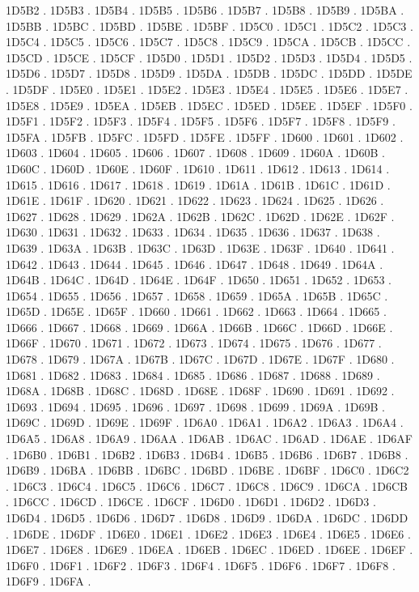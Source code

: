 1D5B2 .
1D5B3 .
1D5B4 .
1D5B5 .
1D5B6 .
1D5B7 .
1D5B8 .
1D5B9 .
1D5BA .
1D5BB .
1D5BC .
1D5BD .
1D5BE .
1D5BF .
1D5C0 .
1D5C1 .
1D5C2 .
1D5C3 .
1D5C4 .
1D5C5 .
1D5C6 .
1D5C7 .
1D5C8 .
1D5C9 .
1D5CA .
1D5CB .
1D5CC .
1D5CD .
1D5CE .
1D5CF .
1D5D0 .
1D5D1 .
1D5D2 .
1D5D3 .
1D5D4 .
1D5D5 .
1D5D6 .
1D5D7 .
1D5D8 .
1D5D9 .
1D5DA .
1D5DB .
1D5DC .
1D5DD .
1D5DE .
1D5DF .
1D5E0 .
1D5E1 .
1D5E2 .
1D5E3 .
1D5E4 .
1D5E5 .
1D5E6 .
1D5E7 .
1D5E8 .
1D5E9 .
1D5EA .
1D5EB .
1D5EC .
1D5ED .
1D5EE .
1D5EF .
1D5F0 .
1D5F1 .
1D5F2 .
1D5F3 .
1D5F4 .
1D5F5 .
1D5F6 .
1D5F7 .
1D5F8 .
1D5F9 .
1D5FA .
1D5FB .
1D5FC .
1D5FD .
1D5FE .
1D5FF .
1D600 .
1D601 .
1D602 .
1D603 .
1D604 .
1D605 .
1D606 .
1D607 .
1D608 .
1D609 .
1D60A .
1D60B .
1D60C .
1D60D .
1D60E .
1D60F .
1D610 .
1D611 .
1D612 .
1D613 .
1D614 .
1D615 .
1D616 .
1D617 .
1D618 .
1D619 .
1D61A .
1D61B .
1D61C .
1D61D .
1D61E .
1D61F .
1D620 .
1D621 .
1D622 .
1D623 .
1D624 .
1D625 .
1D626 .
1D627 .
1D628 .
1D629 .
1D62A .
1D62B .
1D62C .
1D62D .
1D62E .
1D62F .
1D630 .
1D631 .
1D632 .
1D633 .
1D634 .
1D635 .
1D636 .
1D637 .
1D638 .
1D639 .
1D63A .
1D63B .
1D63C .
1D63D .
1D63E .
1D63F .
1D640 .
1D641 .
1D642 .
1D643 .
1D644 .
1D645 .
1D646 .
1D647 .
1D648 .
1D649 .
1D64A .
1D64B .
1D64C .
1D64D .
1D64E .
1D64F .
1D650 .
1D651 .
1D652 .
1D653 .
1D654 .
1D655 .
1D656 .
1D657 .
1D658 .
1D659 .
1D65A .
1D65B .
1D65C .
1D65D .
1D65E .
1D65F .
1D660 .
1D661 .
1D662 .
1D663 .
1D664 .
1D665 .
1D666 .
1D667 .
1D668 .
1D669 .
1D66A .
1D66B .
1D66C .
1D66D .
1D66E .
1D66F .
1D670 .
1D671 .
1D672 .
1D673 .
1D674 .
1D675 .
1D676 .
1D677 .
1D678 .
1D679 .
1D67A .
1D67B .
1D67C .
1D67D .
1D67E .
1D67F .
1D680 .
1D681 .
1D682 .
1D683 .
1D684 .
1D685 .
1D686 .
1D687 .
1D688 .
1D689 .
1D68A .
1D68B .
1D68C .
1D68D .
1D68E .
1D68F .
1D690 .
1D691 .
1D692 .
1D693 .
1D694 .
1D695 .
1D696 .
1D697 .
1D698 .
1D699 .
1D69A .
1D69B .
1D69C .
1D69D .
1D69E .
1D69F .
1D6A0 .
1D6A1 .
1D6A2 .
1D6A3 .
1D6A4 .
1D6A5 .
1D6A8 .
1D6A9 .
1D6AA .
1D6AB .
1D6AC .
1D6AD .
1D6AE .
1D6AF .
1D6B0 .
1D6B1 .
1D6B2 .
1D6B3 .
1D6B4 .
1D6B5 .
1D6B6 .
1D6B7 .
1D6B8 .
1D6B9 .
1D6BA .
1D6BB .
1D6BC .
1D6BD .
1D6BE .
1D6BF .
1D6C0 .
1D6C2 .
1D6C3 .
1D6C4 .
1D6C5 .
1D6C6 .
1D6C7 .
1D6C8 .
1D6C9 .
1D6CA .
1D6CB .
1D6CC .
1D6CD .
1D6CE .
1D6CF .
1D6D0 .
1D6D1 .
1D6D2 .
1D6D3 .
1D6D4 .
1D6D5 .
1D6D6 .
1D6D7 .
1D6D8 .
1D6D9 .
1D6DA .
1D6DC .
1D6DD .
1D6DE .
1D6DF .
1D6E0 .
1D6E1 .
1D6E2 .
1D6E3 .
1D6E4 .
1D6E5 .
1D6E6 .
1D6E7 .
1D6E8 .
1D6E9 .
1D6EA .
1D6EB .
1D6EC .
1D6ED .
1D6EE .
1D6EF .
1D6F0 .
1D6F1 .
1D6F2 .
1D6F3 .
1D6F4 .
1D6F5 .
1D6F6 .
1D6F7 .
1D6F8 .
1D6F9 .
1D6FA .
